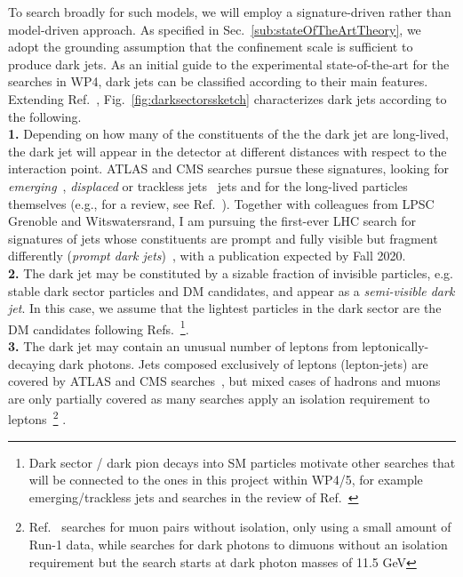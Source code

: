 To search broadly for such models, we will employ a signature-driven rather than model-driven approach.
As specified in Sec.~\ref{sub:stateOfTheArtTheory}, we adopt the grounding assumption that the confinement scale is sufficient to produce dark jets. 
As an initial guide to the experimental state-of-the-art for the searches in WP4, dark jets can be classified according to their main features. 
Extending Ref.~\cite{Cohen:2017pzm,Park:2017rfb}, Fig.~\ref{fig:darksectorssketch} characterizes dark jets according to the following.  
\\
\indent
\textbf{1.} Depending on how many of the constituents of the the dark jet are long-lived, the dark jet will appear in the detector at different distances with respect to the interaction point. ATLAS and CMS searches pursue these signatures, looking for \textit{emerging}~\cite{Schwaller:2015gea,Sirunyan:2018njd}, \textit{displaced} or {trackless jets}~\cite{Aaboud:2019opc,Sirunyan:2018vlw,DeBruyn:2018cdo} jets and for the long-lived particles themselves (e.g.\cite{Sirunyan:2019nfw}, for a review, see Ref.~\cite{Lee:2018pag}). Together with colleagues from LPSC Grenoble and Witswatersrand, I am pursuing the first-ever LHC search for signatures of jets whose constituents are prompt and fully visible but fragment differently (\textit{prompt dark jets})~\cite{Park:2017rfb}, with a publication expected by Fall 2020. 
\\
\indent
\textbf{2.} The dark jet may be constituted by a sizable fraction of invisible particles, e.g. stable dark sector particles and DM candidates, and appear as a \textit{semi-visible dark jet}. In this case, we assume that the lightest particles in the dark sector are the DM candidates following Refs.~\cite{Cohen:2017pzm,Park:2017rfb,Bernreuther:2019pfb}\footnote{Dark sector / dark pion decays into SM particles motivate other searches that will be connected to the ones in this project within WP4/5, for example emerging/trackless jets and searches in the review of Ref.~\cite{Kribs:2018ilo}}.%
\\
\indent
\textbf{3.}  The dark jet may contain an unusual number of leptons from leptonically-decaying dark photons. Jets composed exclusively of leptons (lepton-jets) are covered by ATLAS and CMS searches~\cite{Aad:2019tua,EXOT-2014-09,Khachatryan:2015wka}, %
but mixed cases of hadrons and muons are only partially covered as many searches apply an isolation requirement to leptons~\footnote{Ref.~\cite{Chatrchyan:2011hr} searches for muon pairs without isolation, only using a small amount of Run-1 data, while \cite{Sirunyan:2019wqq} searches for dark photons to dimuons without an isolation requirement but the search starts at dark photon masses of 11.5 GeV} . %

